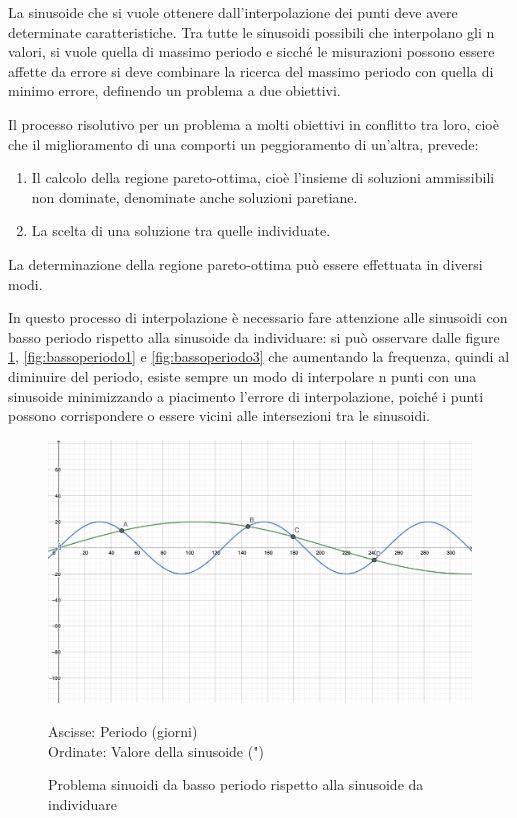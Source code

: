 \documentclass[a4paper,12pt]{report}
\begin{document}
La sinusoide che si vuole ottenere dall'interpolazione dei punti deve avere determinate caratteristiche. Tra tutte le sinusoidi possibili che interpolano gli n valori, si vuole quella di massimo periodo e sicché le misurazioni possono essere affette da errore si deve combinare la ricerca del massimo periodo con quella di minimo errore, definendo un problema a due obiettivi.

Il processo risolutivo per un problema a molti obiettivi in conflitto tra loro, cioè che il miglioramento di una comporti un peggioramento di un'altra, prevede:
\begin{enumerate}
  \item Il calcolo della regione pareto-ottima, cioè l'insieme di soluzioni ammissibili non dominate, denominate anche soluzioni paretiane.
  \item La scelta di una soluzione tra quelle individuate.
\end{enumerate}
La determinazione della regione pareto-ottima può essere effettuata in diversi modi.

In questo processo di interpolazione è necessario fare attenzione alle sinusoidi con basso periodo rispetto alla sinusoide da individuare: si può osservare dalle figure \ref{fig:bassoperiodo2}, \ref{fig:bassoperiodo1} e \ref{fig:bassoperiodo3} che aumentando la frequenza, quindi al diminuire del periodo, esiste sempre un modo di interpolare n punti con una sinusoide minimizzando a piacimento l'errore di interpolazione, poiché i punti possono corrispondere o essere vicini alle intersezioni tra le sinusoidi.

\begin{figure}[H]
  \caption{Problema sinuoidi da basso periodo rispetto alla sinusoide da individuare}
  \begin{center}
  \includegraphics[scale=0.03]{img/bassoperiodo2.png}
  \end{center}
  Ascisse: Periodo (giorni) \\ Ordinate: Valore della sinusoide (")
  \label{fig:bassoperiodo2}
\end{figure}
\end{document}
